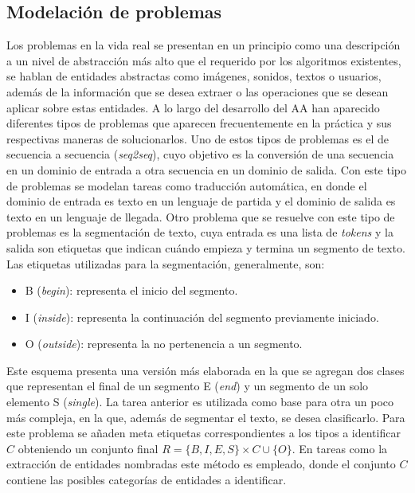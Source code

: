 \subsection{Modelación de problemas}

Los problemas en la vida real se presentan en un principio como una descripción a un nivel de abstracción 
más alto que el requerido por los algoritmos existentes, se hablan de entidades abstractas como imágenes,
sonidos, textos o usuarios, además de la información que se desea extraer o las operaciones que se
desean aplicar sobre estas entidades. A lo largo del desarrollo del AA han aparecido diferentes tipos de problemas 
que aparecen frecuentemente en la práctica y sus respectivas maneras de solucionarlos. Uno de estos tipos de problemas
es el de secuencia a secuencia (\emph{seq2seq}), cuyo objetivo es la conversión de una secuencia en un dominio de entrada a otra 
secuencia en un dominio de salida. Con este tipo de problemas se modelan tareas como traducción automática, en 
donde el dominio de entrada es texto en un lenguaje de partida y el dominio de salida es texto en un lenguaje de llegada.
Otro problema que se resuelve con este tipo de problemas es la segmentación de texto, cuya entrada es una lista de \emph{tokens}
y la salida son etiquetas que indican cuándo empieza y termina un segmento de texto. Las etiquetas utilizadas para 
la segmentación, generalmente, son:

\begin{itemize}
	\item B (\emph{begin}): representa el inicio del segmento.
	\item I (\emph{inside}): representa la continuación del segmento previamente iniciado.
	\item O (\emph{outside}): representa la no pertenencia a un segmento.
\end{itemize}

Este esquema presenta una versión más elaborada en la que se agregan dos clases que representan el final 
de un segmento E (\emph{end}) y un segmento de un solo elemento S (\emph{single}). La tarea anterior es 
utilizada como base para otra un poco más compleja, en la que, además de segmentar el texto, se desea 
clasificarlo. Para este problema se añaden meta etiquetas correspondientes a los tipos a identificar $C$ 
obteniendo un conjunto final $R = \{ B, I, E, S \} \times C \cup \{ O \}$. En tareas como la extracción de entidades
nombradas este método es empleado, donde el conjunto $C$ contiene las posibles categorías de entidades a identificar.

